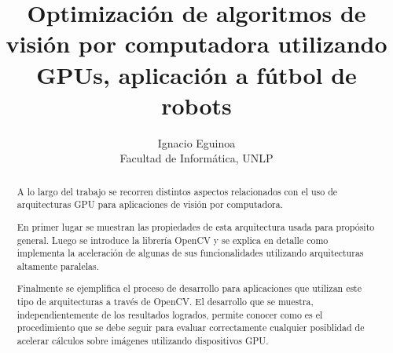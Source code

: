 \documentclass[a4paper,10pt]{report}
\title{Optimización de algoritmos de visión por computadora utilizando GPUs, aplicación a fútbol de robots}
\author{Ignacio Eguinoa \\
\small Facultad de Informática, UNLP}
\date{}
\begin{document}
\maketitle


\begin{abstract}





A lo largo del trabajo se recorren distintos aspectos relacionados con el uso de arquitecturas GPU para aplicaciones de visión por computadora. 

En primer lugar se muestran las propiedades de esta arquitectura usada para propósito general. 
Luego se introduce la librería OpenCV y se explica en detalle como implementa la aceleración de algunas de sus funcionalidades utilizando arquitecturas altamente paralelas. 

Finalmente se ejemplifica el proceso de desarrollo para aplicaciones que utilizan este tipo de arquitecturas a través de OpenCV. 
El desarrollo que se muestra, independientemente de los resultados logrados, permite conocer como es el procedimiento que se debe seguir para evaluar correctamente cualquier posiblidad de acelerar cálculos sobre imágenes utilizando dispositivos GPU.

\end{abstract}


\tableofcontents
\end{document}
